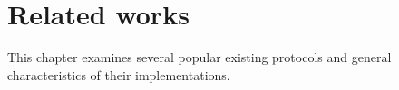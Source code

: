 
\chapter{Related works}

This chapter examines several popular existing protocols and general characteristics of their implementations.
